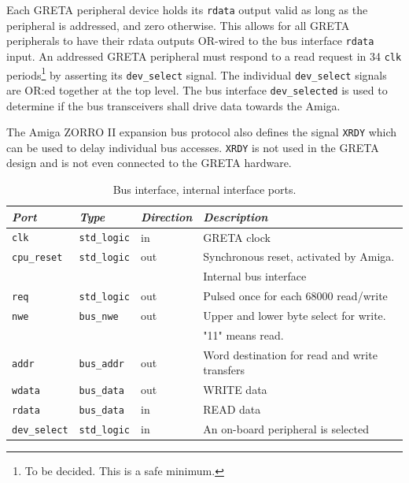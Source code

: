 \documentclass[a4paper]{report}
\begin{document}
Each GRETA peripheral device holds its \texttt{rdata}
output valid as long as the peripheral is addressed, and zero
otherwise. This allows for all GRETA peripherals to have their
rdata outputs OR-wired to the bus interface \texttt{rdata}
input. An addressed GRETA peripheral must respond to a read
request in 34 \texttt{clk} periods\footnote{To be decided. This
is a safe minimum.} by asserting its \texttt{dev\_select}
signal. The individual \texttt{dev\_select} signals
are OR:ed together at the top level. The bus interface
\texttt{dev\_selected} is used to determine if the bus
transceivers shall drive data towards the Amiga.

The Amiga ZORRO II expansion bus protocol also defines the
signal \texttt{XRDY} which can be used to delay individual
bus accesses. \texttt{XRDY} is not used in the GRETA design
and is not even connected to the GRETA hardware.

\begin{table}
\begin{tabular}{*4l}    \toprule
\emph{Port} & \emph{Type}  & \emph{Direction}  & \emph{Description} \\ \midrule
\texttt{clk}        & \texttt{std\_logic}& in  & GRETA clock\\
\texttt{cpu\_reset} & \texttt{std\_logic}& out & Synchronous reset, activated by Amiga. \\
\midrule
\midrule
                    &                   &       & Internal bus interface \\
\midrule
\texttt{req}        & \texttt{std\_logic}& out & Pulsed once for each 68000 read/write \\
\texttt{nwe}        & \texttt{bus\_nwe} & out  & Upper and lower byte select for write.\\
                    &                   &      & "11" means read. \\
\texttt{addr}       & \texttt{bus\_addr}& out  & Word destination for read and write transfers \\ 
\texttt{wdata}      & \texttt{bus\_data}& out  & WRITE data \\
\texttt{rdata}      & \texttt{bus\_data}& in   & READ data \\
\texttt{dev\_select}& \texttt{std\_logic}& in  & An on-board peripheral is selected \\
\midrule
\bottomrule
 \hline
\end{tabular}
\caption{Bus interface, internal interface ports.}
\label{bus_interface}
\end{table}
\end{document}
